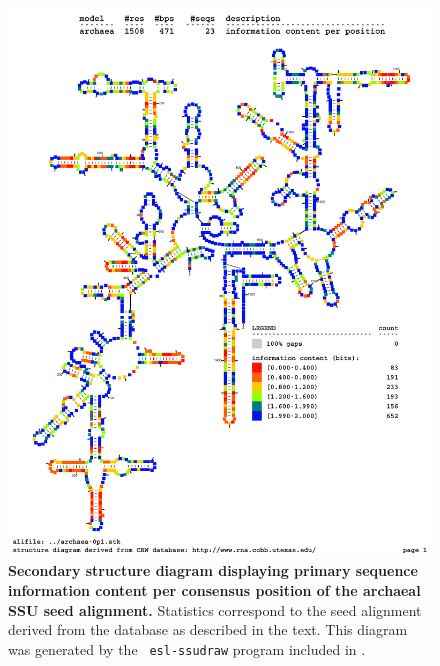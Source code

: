 \begin{figure}
\begin{center}
\includegraphics[width=5.5in]{../../seeds/ss-diagrams/archaea-0p1-info}
\end{center}
\caption[Secondary structure diagram displaying primary sequence
  information content per consensus position of the archaeal SSU seed
  alignment]{\textbf{Secondary structure diagram displaying primary
  sequence information content per consensus position of the archaeal SSU seed
  alignment.} Statistics correspond to the  seed
  alignment derived from the  database \cite{CannoneGutell02}
  as described in the text. This diagram was generated by the {\tt
  esl-ssudraw} program included in .}
\label{fig:arcinfo}
\end{figure}

